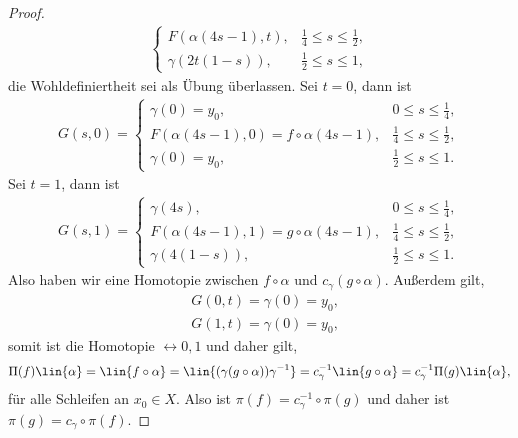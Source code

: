 \begin{proof}
\begin{align*}
\begin{cases}
F(\alpha(4s-1),t), & \frac{1}{4}\le s\le \frac{1}{2},\\
\gamma(2t(1-s)), & \frac{1}{2}\le s\le 1,
\end{cases}
\end{align*}
die Wohldefiniertheit sei als Übung überlassen. Sei $t=0$, dann ist
\begin{align*}
G(s,0) = \begin{cases}
\gamma(0) = y_0, & 0\le s\le \frac{1}{4},\\
F(\alpha(4s-1),0) = f\circ\alpha(4s-1), & \frac{1}{4}\le s\le \frac{1}{2},\\
\gamma(0) = y_0, & \frac{1}{2}\le s\le 1. 
         \end{cases}
\end{align*}
Sei $t=1$, dann ist
\begin{align*}
G(s,1) = \begin{cases}
\gamma(4s) , & 0\le s\le \frac{1}{4},\\
F(\alpha(4s-1),1) = g\circ\alpha(4s-1), & \frac{1}{4}\le s\le \frac{1}{2},\\
\gamma(4(1-s)) , & \frac{1}{2}\le s\le 1. 
         \end{cases}
\end{align*}
Also haben wir eine Homotopie zwischen $f\circ\alpha$ und
$c_\gamma(g\circ\alpha)$. Außerdem gilt,
\begin{align*}
&G(0,t) = \gamma(0)= y_0,\\
&G(1,t) = \gamma(0) = y_0,
\end{align*}
somit ist die Homotopie $\rel{0,1}$ und daher gilt,
\begin{align*}
\Pi(f)\lin{\alpha} = \lin{f\circ\alpha} =
\lin{(\gamma(g\circ\alpha))\gamma^{-1}}
= c_{\gamma}^{-1}\lin{g\circ\alpha}
= c_{\gamma}^{-1}\Pi(g)\lin{\alpha},
\end{align*}
für alle Schleifen an $x_0\in X$. Also ist $\pi(f) = c_{\gamma}^{-1}\circ
\pi(g)$ und daher ist $\pi(g) = c_\gamma\circ \pi(f)$.\qedhere
\end{proof}

